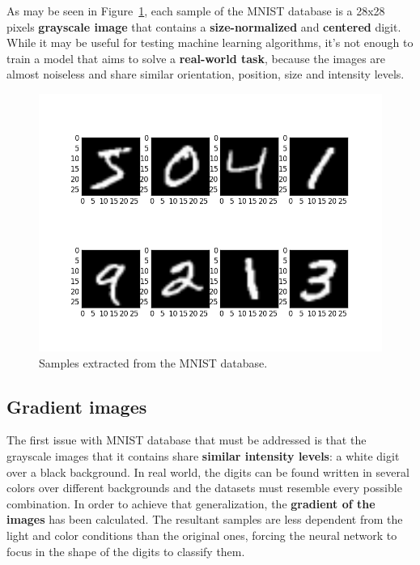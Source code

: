 As may be seen in Figure~\ref{fig:mnist}, each sample of the MNIST database is a 28x28 pixels \textbf{grayscale image} that contains a \textbf{size-normalized} and \textbf{centered} digit. While it may be useful for testing machine learning algorithms, it's not enough to train a model that aims to solve a \textbf{real-world task}, because the images are almost noiseless and share similar orientation, position, size and intensity levels.
\begin{figure}
	\centering
	\includegraphics[width=12cm, keepaspectratio]{figures/mnist.png}
	\caption{Samples extracted from the MNIST database.}
	\label{fig:mnist}
\end{figure}

\subsection{Gradient images}\label{subsec:edge}
The first issue with MNIST database that must be addressed is that the grayscale images that it contains share \textbf{similar intensity levels}: a white digit over a black background. In real world, the digits can be found written in several colors over different backgrounds and the datasets must resemble every possible combination. In order to achieve that generalization, the \textbf{gradient of the images} has been calculated. The resultant samples are less dependent from the light and color conditions than the original ones, forcing the neural network to focus in the shape of the digits to classify them.

